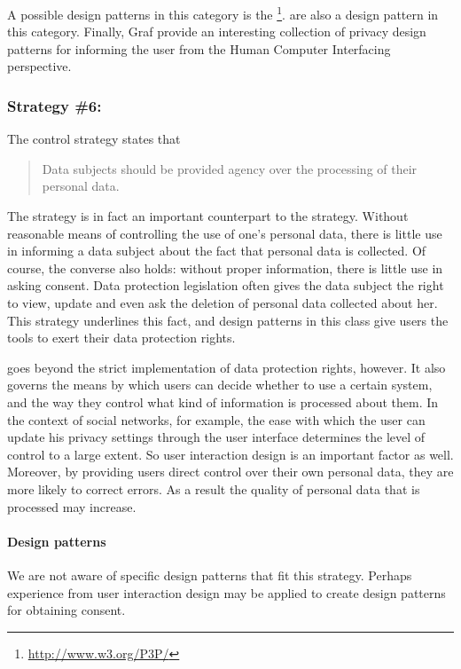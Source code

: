 A possible design patterns in this category is the \footnote{\url{http://www.w3.org/P3P/}
}. 
 are also a design pattern in this category. 
Finally, Graf \etal\cite{graf2010patterncollection} provide an interesting collection of privacy design patterns for informing the user from the Human Computer Interfacing perspective.

\subsubsection{Strategy \#6: }

The control strategy states that 
\begin{quote}
Data subjects should be provided agency over the processing of their personal data.
\end{quote}
The  strategy is in fact an important counterpart to the  strategy. Without reasonable means of controlling the use of one's personal data, there is little use in informing a data subject about the fact that personal data is collected. Of course, the converse also holds: without proper information, there is little use in asking consent. Data protection legislation often gives the data subject the right to view, update and even ask the deletion of personal data collected about her. This strategy underlines this fact, and design patterns in this class give users the tools to exert their data protection rights.

 goes beyond the strict implementation of data protection rights, however. It also governs the means by which users can decide whether to use a certain system, and the way they control what kind of information is processed about them. In the context of social networks, for example, the ease with which the user can update his privacy settings through the user interface determines the level of control to a large extent. So user interaction design is an important factor as well. Moreover, by providing users direct control over their own personal data, they are more likely to correct errors. As a result the quality of personal data that is processed may increase.

\paragraph{Design patterns}

We are not aware of specific design patterns that fit this strategy. 
Perhaps experience from user interaction design may be applied to create design patterns for obtaining consent.

